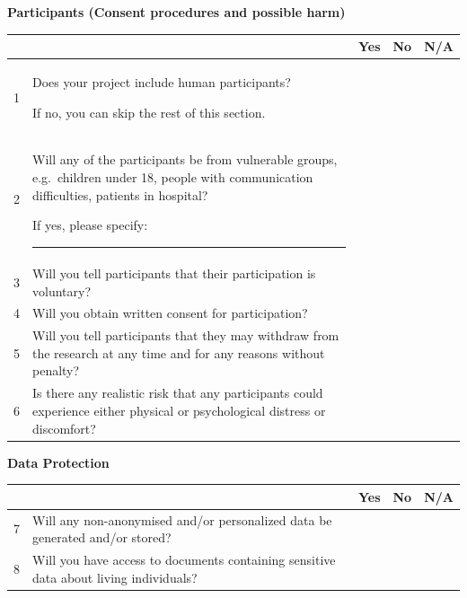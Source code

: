 \documentclass[11pt,a4paper]{article}
\begin{document}
\vspace{\baselineskip}

\newcommand{\ynahead}{%
  \hline
  \rule{0pt}{14pt} & & \textbf{Yes} & \textbf{No} & \textbf{N/A} \\ \hline}

\newcommand{\ynarowNone}[2]{%
  \rule{0pt}{14pt}#1 & #2 & & & \\ \hline}
\newcommand{\ynarowYes}[2]{%
  \rule{0pt}{14pt}#1 & #2 & \cellcolor{shade} & & \\ \hline}
\newcommand{\ynarowNo}[2]{%
  \rule{0pt}{14pt}#1 & #2 & & \cellcolor{shade} & \\ \hline}

\begingroup
{}        %
\renewcommand{\arraystretch}{1.2} %

\textbf{Participants (Consent procedures and possible harm)}

\begin{tabular}{|p{0.7cm}|p{11.1cm}|c|c|c|}
\ynahead
\ynarowNone{1}{Does your project include human participants?

\vspace{\baselineskip}
If no, you can skip the rest of this section.}
\ynarowYes{2}{Will any of the participants be from vulnerable groups, e.g.\ children under 18, people with communication difficulties, patients in hospital? 

\vspace{\baselineskip}
If yes, please specify: \rule{2.5cm}{0.4pt}}
\ynarowNo{3}{Will you tell participants that their participation is voluntary?}
\ynarowNo{4}{Will you obtain written consent for participation?}
\ynarowNo{5}{Will you tell participants that they may withdraw from the research at any time and for any reasons without penalty?}
\ynarowYes{6}{Is there any realistic risk that any participants could experience either physical or psychological distress or discomfort?}
\end{tabular}

\vspace{\baselineskip}

\textbf{Data Protection}

\begin{tabular}{|p{0.7cm}|p{11.1cm}|c|c|c|}
\ynahead
\ynarowYes{7}{Will any non-anonymised and/or personalized data be generated and/or stored?}
\ynarowYes{8}{Will you have access to documents containing sensitive data about living individuals?}
\end{tabular}
\end{document}
